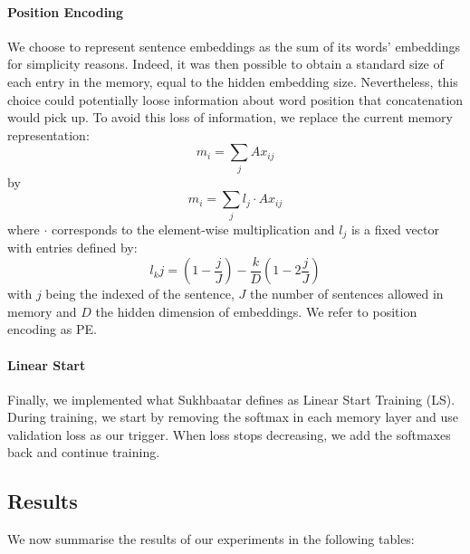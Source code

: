 \documentclass[twoside,11pt]{article}
\begin{document}
\paragraph{Position Encoding}
We choose to represent sentence embeddings as the sum of its words' embeddings for simplicity reasons. Indeed, it was then possible to obtain a standard size of each entry in the memory, equal to the hidden embedding size. Nevertheless, this choice could potentially loose information about word position that concatenation would pick up. To avoid this loss of information, we replace the current memory representation:$$m_i = \sum_j Ax_{ij}$$ by $$m_i = \sum_j l_j\cdot A x_{ij}$$ where $\cdot$ corresponds to the element-wise multiplication and $l_j$ is a fixed vector with entries defined by: $$l_kj = (1-\frac{j}{J})-\frac{k}{D}(1-2\frac{j}{J})$$ with $j$ being the indexed of the sentence, $J$ the number of sentences allowed in memory and $D$ the hidden dimension of embeddings. We refer to position encoding as PE.
\paragraph{Linear Start}
Finally, we implemented what Sukhbaatar defines as Linear Start Training (LS). During training, we start by removing the softmax in each memory layer and use validation loss as our trigger. When loss stops decreasing, we add the softmaxes back and continue training. 

\subsection{Results}

We now summarise the results of our experiments in the following tables:
\end{document}
